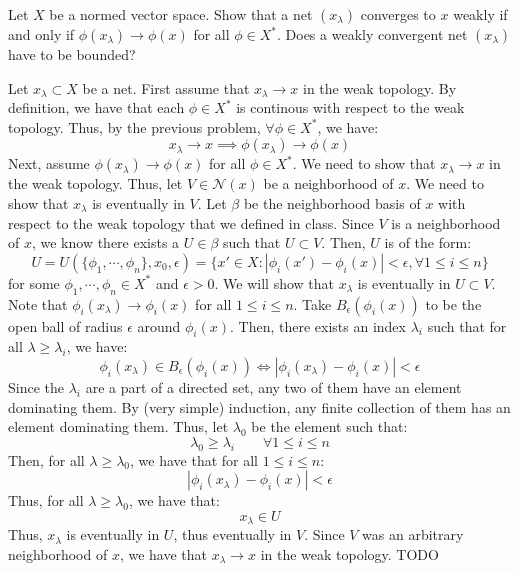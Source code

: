 \documentclass[12pt]{article}
\begin{document}
\begin{problem}{49}
    Let $X$ be a normed vector space. Show that a net $(x_\lambda)$ converges to $x$ weakly if and only if $\phi(x_\lambda) \to \phi(x)$ for all $\phi \in X^*$. Does a weakly convergent net $(x_\lambda)$ have to be bounded?
\end{problem}
\begin{solution}
    Let $x_\lambda \subset X$ be a net. \bbni 
    First assume that $x_\lambda \to x$ in the weak topology. By definition, we have that each $\phi \in X^*$ is continous with respect to the weak topology. Thus, by the previous problem, $\forall \phi \in X^*$, we have:
    \[ x_\lambda \to x \implies \phi(x_\lambda) \to \phi(x)\] 
    Next, assume $\phi(x_\lambda) \to \phi(x)$ for all $\phi \in X^*$. We need to show that $x_\lambda \to x$ in the weak topology. Thus, let $V \in \mathcal N(x)$ be a neighborhood of $x$. We need to show that $x_\lambda$ is eventually in $V$. \bbni
    Let $\beta$ be the neighborhood basis of $x$ with respect to the weak topology that we defined in class. Since $V$ is a neighborhood of $x$, we know there exists a $U \in \beta$ such that $U \subset V$. Then, $U$ is of the form: 
    \[ U = U(\{\phi_1, \cdots, \phi_n\}, x_0, \epsilon) = \{x' \in X: |\phi_i(x')-\phi_i(x)| < \epsilon, \forall 1 \leq i \leq n\}\]
    for some $\phi_1, \cdots, \phi_n \in X^*$ and $\epsilon > 0$. We will show that $x_\lambda$ is eventually in $U \subset V$. \bbni
    Note that $\phi_i(x_\lambda) \to \phi_i(x)$ for all $1 \leq i \leq n$. Take $B_\epsilon(\phi_i(x))$ to be the open ball of radius $\epsilon$ around $\phi_i(x)$. Then, there exists an index $\lambda_i$ such that for all $\lambda \geq \lambda_i$, we have:
    \[ \phi_i(x_\lambda) \in B_\epsilon(\phi_i(x)) \iff |\phi_i(x_\lambda) - \phi_i(x)| < \epsilon \]
    Since the $\lambda_i$ are a part of a directed set, any two of them have an element dominating them. By (very simple) induction, any finite collection of them has an element dominating them. Thus, let $\lambda_0$ be the element such that: 
    \[ \lambda_0 \geq \lambda_i \qquad \forall 1 \leq i \leq n \]
    Then, for all $\lambda \geq \lambda_0$, we have that for all $1 \leq i \leq n$: 
    \[ |\phi_i(x_\lambda) - \phi_i(x)| < \epsilon \]
    Thus, for all $\lambda \geq \lambda_0$, we have that:
    \[ x_\lambda \in U\]
    Thus, $x_\lambda$ is eventually in $U$, thus eventually in $V$. Since $V$ was an arbitrary neighborhood of $x$, we have that $x_\lambda \to x$ in the weak topology. \bbni
    TODO
\end{solution}
\newpage
\end{document}
